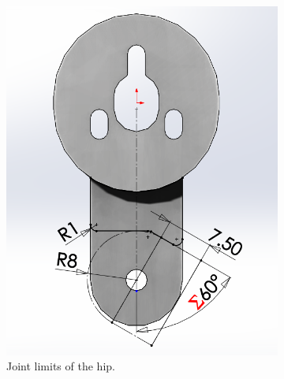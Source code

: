 \begin{figure}[ht!]
    \centering
    \begin{subfigure}[b]{0.49\textwidth}
        \includegraphics[width=\textwidth]{figures/joint_limits_hip.PNG}
        \caption{Joint limits of the hip.}
        \label{fig:joint_limits_hip}
    \end{subfigure}
    \begin{subfigure}[b]{0.49\textwidth}

\end{subfigure}
\end{figure}
